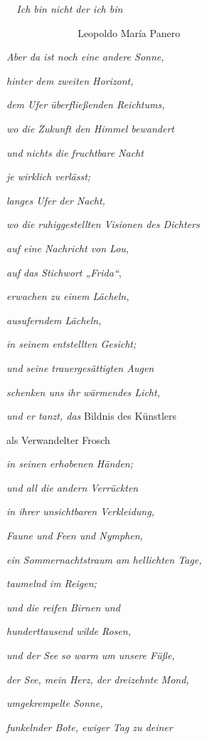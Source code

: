 \documentclass[a4paper]{article}
\begin{document}
{\itshape
\ \ Ich bin nicht der ich bin}

\textit{\ \  \ \ \ \ \ \ \ \ \ \ \ \ }Leopoldo María Panero


\bigskip

{\itshape
Aber da ist noch eine andere Sonne,}

{\itshape
hinter dem zweiten Horizont,}

{\itshape
dem Ufer überfließenden Reichtums, }

{\itshape
wo die Zukunft den Himmel bewandert}

{\itshape
und nichts die fruchtbare Nacht }

{\itshape
je wirklich verlässt;}

{\itshape
langes Ufer der Nacht, }

{\itshape
wo die ruhiggestellten Visionen des Dichters }

{\itshape
auf eine Nachricht von Lou, }

\textit{auf das Stichwort „Frida“},

{\itshape
erwachen zu einem Lächeln,}

{\itshape
ausuferndem Lächeln,}

{\itshape
in seinem entstellten Gesicht;}

{\itshape
und seine trauergesättigten Augen}

{\itshape
schenken uns ihr wärmendes Licht, }

\textit{und er tanzt, das }Bildnis des Künstlers

als Verwandelter Frosch 

{\itshape
in seinen erhobenen Händen;}

{\itshape
und all die andern Verrückten}

{\itshape
in ihrer unsichtbaren Verkleidung,}

{\itshape
Faune und Feen und Nymphen,}

{\itshape
ein Sommernachtstraum am hellichten Tage,}

{\itshape
taumelnd im Reigen;}

{\itshape
und die reifen Birnen und}

{\itshape
hunderttausend wilde Rosen,}

{\itshape
und der See so warm um unsere Füße,}

{\itshape
der See, mein Herz, der dreizehnte Mond, }

{\itshape
umgekrempelte Sonne,}

{\itshape
funkelnder Bote, ewiger Tag zu deiner}
\end{document}
